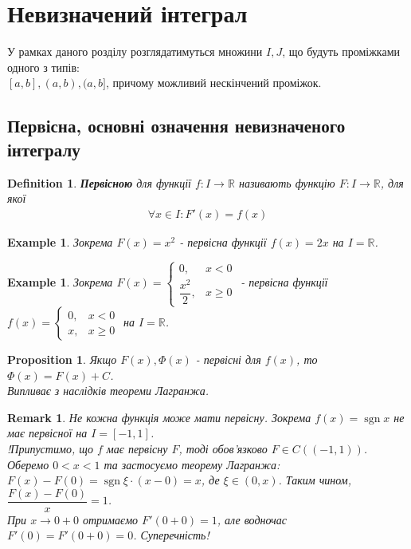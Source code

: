 \documentclass[a4paper, 10pt]{article}
\DeclareMathOperator\sign{sgn}
\theoremstyle{theoremdd}
\theoremstyle{theoremdd}
\theoremstyle{theoremdd}
\newtheorem{definition}[theorem]{Definition}
\theoremstyle{theoremdd}
\theoremstyle{theoremdd}
\newtheorem{example}[theorem]{Example}
\theoremstyle{theoremdd}
\newtheorem{proposition}[theorem]{Proposition}
\theoremstyle{theoremdd}
\newtheorem{remark}[theorem]{Remark}
\theoremstyle{theoremdd}
\theoremstyle{theoremdd}
\begin{document}

\tableofcontents
\newpage
\iffalse
\section{Невизначений інтеграл}
У рамках даного розділу розглядатимуться множини $I,J$, що будуть проміжками одного з типів:\\
$[a,b], (a,b), (a,b]$, причому можливий нескінчений проміжок.
\subsection{Первісна, основні означення невизначеного інтегралу}

\begin{definition}
\textbf{Первісною} для функції $f: I \to \mathbb{R}$ називають функцію $F: I \to \mathbb{R}$, для якої
\begin{align*}
\forall x \in I: F'(x) = f(x)
\end{align*}
\end{definition}

\begin{example}
Зокрема $F(x) = x^2$ - первісна функції $f(x) = 2x$ на $I = \mathbb{R}$.
\end{example}

\begin{example}
Зокрема $F(x) = \begin{cases} 0, & x < 0 \\ \dfrac{x^2}{2}, & x \geq 0\end{cases}$ - первісна функції $f(x) = \begin{cases} 0, & x < 0 \\ x, & x \geq 0 \end{cases}$ на $I = \mathbb{R}$.
\end{example}

\begin{proposition}
Якщо $F(x), \Phi(x)$ - первісні для $f(x)$, то $\Phi(x) = F(x) + C$.\\
\textit{Випливає з наслідків теореми Лагранжа.}
\end{proposition}

\begin{remark}
Не кожна функція може мати первісну. Зокрема $f(x) = \sign x$ не має первісної на $I = [-1,1]$.\\
!Припустимо, що $f$ має первісну $F$, тоді обов'язково $F \in C((-1,1))$. Оберемо $0 < x < 1$ та застосуємо теорему Лагранжа:\\
$F(x) - F(0) = \sign \xi \cdot (x - 0) = x$, де $\xi \in (0,x)$. Таким чином, $\dfrac{F(x)-F(0)}{x} = 1$.\\
При $x \to 0+0$ отримаємо $F'(0+0) = 1$, але водночас $F'(0) = F'(0+0) = 0$. Суперечність!
\end{remark}
\end{document}
